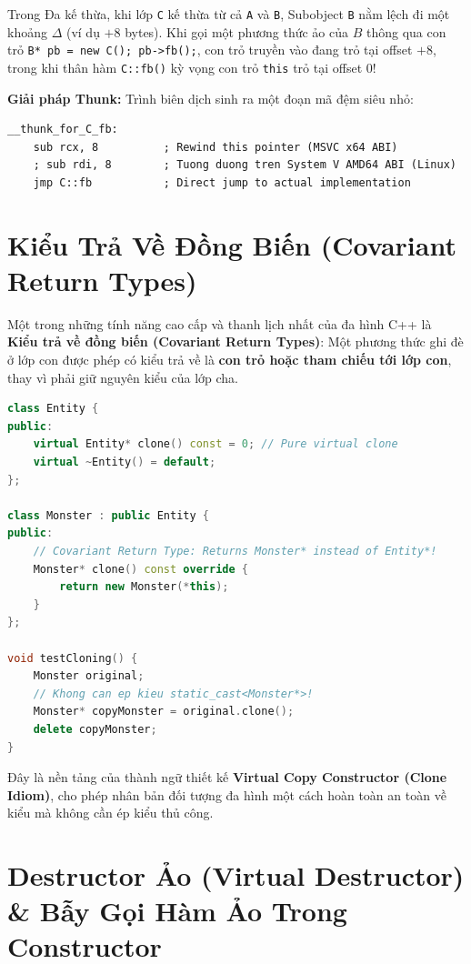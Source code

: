 \documentclass[12pt,a4paper,oneside]{book}
\begin{document}
Trong Đa kế thừa, khi lớp \texttt{C} kế thừa từ cả \texttt{A} và \texttt{B}, Subobject \texttt{B} nằm lệch đi một khoảng $\Delta$ (ví dụ $+8$ bytes). Khi gọi một phương thức ảo của $B$ thông qua con trỏ \texttt{B* pb = new C(); pb->fb();}, con trỏ truyền vào đang trỏ tại offset $+8$, trong khi thân hàm \texttt{C::fb()} kỳ vọng con trỏ \texttt{this} trỏ tại offset 0!

\textbf{Giải pháp Thunk:} Trình biên dịch sinh ra một đoạn mã đệm siêu nhỏ:
\begin{lstlisting}[language={[x86masm]Assembler}]
__thunk_for_C_fb:
    sub rcx, 8          ; Rewind this pointer (MSVC x64 ABI)
    ; sub rdi, 8        ; Tuong duong tren System V AMD64 ABI (Linux)
    jmp C::fb           ; Direct jump to actual implementation
\end{lstlisting}

\section{Kiểu Trả Về Đồng Biến (Covariant Return Types)}

Một trong những tính năng cao cấp và thanh lịch nhất của đa hình C++ là \textbf{Kiểu trả về đồng biến (Covariant Return Types)}: Một phương thức ghi đè ở lớp con được phép có kiểu trả về là \textbf{con trỏ hoặc tham chiếu tới lớp con}, thay vì phải giữ nguyên kiểu của lớp cha.

\begin{lstlisting}[language=C++]
class Entity {
public:
    virtual Entity* clone() const = 0; // Pure virtual clone
    virtual ~Entity() = default;
};

class Monster : public Entity {
public:
    // Covariant Return Type: Returns Monster* instead of Entity*!
    Monster* clone() const override {
        return new Monster(*this);
    }
};

void testCloning() {
    Monster original;
    // Khong can ep kieu static_cast<Monster*>!
    Monster* copyMonster = original.clone(); 
    delete copyMonster;
}
\end{lstlisting}
Đây là nền tảng của thành ngữ thiết kế \textbf{Virtual Copy Constructor (Clone Idiom)}, cho phép nhân bản đối tượng đa hình một cách hoàn toàn an toàn về kiểu mà không cần ép kiểu thủ công.

\section{Destructor Ảo (Virtual Destructor) \& Bẫy Gọi Hàm Ảo Trong Constructor}
\end{document}
